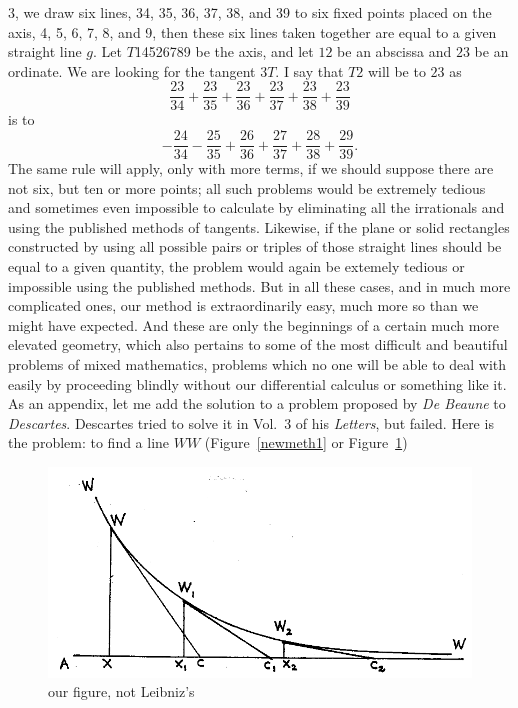 \documentclass[polutonikogreek,english,twoside,openright]{article}
\begin{document}
3, we draw six lines, 34, 35, 36, 37, 38, and 39 to six fixed points
placed on the axis, 4, 5, 6, 7, 8, and 9, then these six lines taken
together are equal to a given straight line $g$.  Let $T$14526789 be
the axis, and let $12$ be an abscissa and $23$ be an ordinate.  We are
looking for the tangent $3T$.  I say that $T2$ will be to $23$
as
$$\frac{23}{34} + \frac{23}{35} +\frac{23}{36} + \frac{23}{37} + \frac{23}{38}
+\frac{23}{39}$$ is to
$$-\frac{24}{34} - \frac{25}{35} +\frac{26}{36} +\frac{27}{37} + \frac{28}{38}
+ \frac{29}{39}.$$ The same rule will apply, only with more terms, if we
should suppose there are not six, but ten or more points; all such problems would be
extremely tedious and sometimes even impossible to calculate by eliminating
all the irrationals and using the published methods of tangents.  Likewise, if 
the plane or solid rectangles constructed by using all possible pairs or
triples of those straight lines should be equal to a given quantity, the problem would again be extemely tedious or impossible using the published methods.\label{enmex3}    But in all these cases, and in much more complicated ones, our method is
extraordinarily easy, much more so than we might have expected.  And these are
only the beginnings of a certain much more elevated geometry, which also
pertains to some of the most difficult and beautiful problems of mixed
mathematics, problems which no one will be able to deal with easily by
proceeding blindly without our differential calculus or something like it.  \label{begdeb} As
an appendix, let me add the solution to a problem proposed by {\em De Beaune}
to {\em Descartes}.  Descartes tried to solve it in Vol.\ 3 of his {\em
Letters}, but failed.  Here is the problem: to find a line $WW$ (Figure~\ref{newmeth1} or Figure~\ref{debeaune})
\begin{figure}[htp]
\begin{center}
\includegraphics[width=.8\textwidth]{fig/Figure26}
\caption{our figure, not Leibniz's}
\label{debeaune}
\end{center}
\end{figure} 
\end{document}
